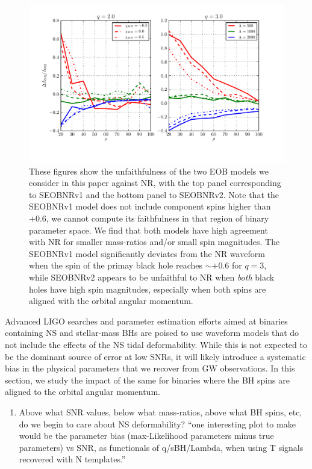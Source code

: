 \documentclass[aps,prd,amsmath,floats,floatfix, twocolumn,
superscriptaddress,nofootinbib,showpacs]{revtex4-1}
\begin{document}
% 
\begin{figure}[h]
\centering    
\includegraphics[width=2\columnwidth]{plots/TT_NSLambdaBias_vs_SNR_q23.pdf}
\caption{These figures show the unfaithfulness of the two EOB models we consider
in this paper against NR, with the top panel corresponding to SEOBNRv1 and the bottom panel to
SEOBNRv2. Note that the SEOBNRv1 model does not include component spins
higher than $+0.6$, we cannot compute its faithfulness in that region of binary parameter space.
We find that both models have high agreement with NR for smaller mass-ratios 
and/or small spin magnitudes. The SEOBNRv1 model significantly deviates from the NR 
waveform when the spin of the primay black hole reaches $\sim +0.6$ for $q=3$, while
SEOBNRv2 appears to be unfaithful to NR when \textit{both} black holes have high spin 
magnitudes, especially when both spins are aligned with the orbital angular momentum.
}
\label{fig:SEOB_unfaith_TotalMass_Spin1z_Spin2z}
\end{figure}
% 
% 
Advanced LIGO searches and parameter estimation efforts aimed at binaries 
containing NS and stellar-mass BHs are poised to use waveform models that do not
include the effects of the NS tidal deformability. While this is not expected to
be the dominant source of error at low SNRs, it will likely introduce a
systematic bias in the physical parameters that we recover from GW observations.
In this section, we study the impact of the same for binaries where the BH spins
are aligned to the orbital angular momentum.

\begin{enumerate}
\item Above what SNR values, below what mass-ratios, above what BH spins, etc, 
do we begin to care about NS deformability?\newline
``one interesting plot to make would be the parameter bias (max-Likelihood
parameters minus true parameters) vs SNR, as functionals of q/sBH/Lambda, when
using T signals recovered with N templates.''
\end{enumerate}
\end{document}

